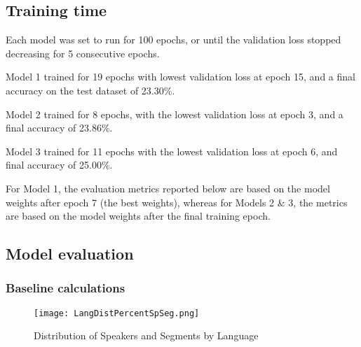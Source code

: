 \documentclass[11pt, letterpaper]{article}
\begin{document}
\subsection{Training time}

Each model was set to run for 100 epochs, or until the validation loss stopped decreasing for 5 consecutive epochs. 

Model 1 trained for 19 epochs with lowest validation loss at epoch 15, and a final accuracy on the test dataset of 23.30\%.
 
Model 2 trained for 8 epochs, with the lowest validation loss at epoch 3, and a final accuracy of 23.86\%.

Model 3 trained for 11 epochs with the lowest validation loss at epoch 6, and final accuracy of 25.00\%.

For Model 1, the evaluation metrics reported below are based on the model weights after epoch 7 (the best weights), whereas for Models 2 \& 3, the metrics are based on the model weights after the final training epoch.

\subsection{Model evaluation}
\subsubsection{Baseline calculations}


\begin{figure}[h]
\begin{center}
\texttt{[image: LangDistPercentSpSeg.png]}
\caption{Distribution of Speakers and Segments by Language}
\label{fig:LangDistTot}
\end{center}
\end{figure}
\end{document}
